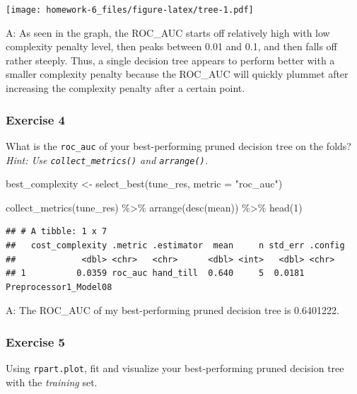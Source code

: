 \documentclass[
]{article}
\newenvironment{Shaded}{\begin{snugshade}}{\end{snugshade}}
\newcommand{\AttributeTok}[1]{\textcolor[rgb]{0.77,0.63,0.00}{#1}}
\newcommand{\DecValTok}[1]{\textcolor[rgb]{0.00,0.00,0.81}{#1}}
\newcommand{\FunctionTok}[1]{\textcolor[rgb]{0.00,0.00,0.00}{#1}}
\newcommand{\NormalTok}[1]{#1}
\newcommand{\OtherTok}[1]{\textcolor[rgb]{0.56,0.35,0.01}{#1}}
\newcommand{\SpecialCharTok}[1]{\textcolor[rgb]{0.00,0.00,0.00}{#1}}
\newcommand{\StringTok}[1]{\textcolor[rgb]{0.31,0.60,0.02}{#1}}
\begin{document}
\texttt{[image: homework-6\_files/figure-latex/tree-1.pdf]}

A: As seen in the graph, the ROC\_AUC starts off relatively high with
low complexity penalty level, then peaks between 0.01 and 0.1, and then
falls off rather steeply. Thus, a single decision tree appears to
perform better with a smaller complexity penalty because the ROC\_AUC
will quickly plummet after increasing the complexity penalty after a
certain point.

\hypertarget{exercise-4}{%
\subsubsection{Exercise 4}\label{exercise-4}}

What is the \texttt{roc\_auc} of your best-performing pruned decision
tree on the folds? \emph{Hint: Use \texttt{collect\_metrics()} and
\texttt{arrange()}.}

\begin{Shaded}
\begin{Highlighting}[]
\NormalTok{best\_complexity }\OtherTok{\textless{}{-}} \FunctionTok{select\_best}\NormalTok{(tune\_res, }\AttributeTok{metric =} \StringTok{"roc\_auc"}\NormalTok{)}

\FunctionTok{collect\_metrics}\NormalTok{(tune\_res) }\SpecialCharTok{\%\textgreater{}\%} \FunctionTok{arrange}\NormalTok{(}\FunctionTok{desc}\NormalTok{(mean)) }\SpecialCharTok{\%\textgreater{}\%} \FunctionTok{head}\NormalTok{(}\DecValTok{1}\NormalTok{)}
\end{Highlighting}
\end{Shaded}

\begin{verbatim}
## # A tibble: 1 x 7
##   cost_complexity .metric .estimator  mean     n std_err .config              
##             <dbl> <chr>   <chr>      <dbl> <int>   <dbl> <chr>                
## 1          0.0359 roc_auc hand_till  0.640     5  0.0181 Preprocessor1_Model08
\end{verbatim}

A: The ROC\_AUC of my best-performing pruned decision tree is 0.6401222.

\hypertarget{exercise-5}{%
\subsubsection{Exercise 5}\label{exercise-5}}

Using \texttt{rpart.plot}, fit and visualize your best-performing pruned
decision tree with the \emph{training} set.
\end{document}
